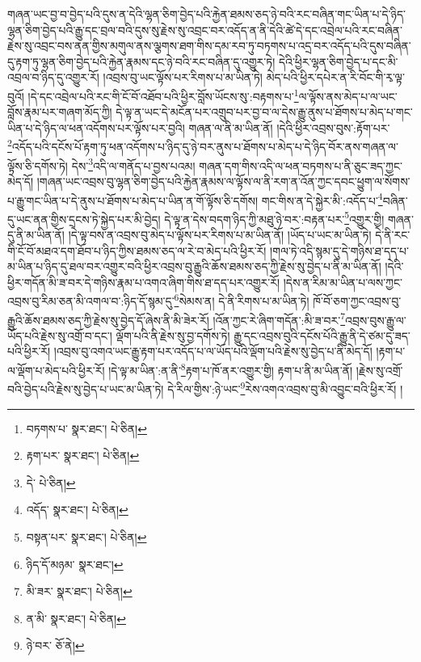 གཞན་ཡང་བྱ་བ་བྱེད་པའི་དུས་ན་དེའི་ལྷན་ཅིག་བྱེད་པའི་རྐྱེན་ཐམས་ཅད་ཉེ་བའི་རང་བཞིན་གང་ཡིན་པ་དེ་ཉིད་ལྷན་ཅིག་བྱེད་པའི་རྒྱུ་དང་བྲལ་བའི་དུས་སུ་རྗེས་སུ་འབྲང་བར་འདོད་ན་ནི་དེའི་ཚེ་དེ་དང་འབྲེལ་པའི་རང་བཞིན་རྗེས་སུ་འབྲང་བས་ནན་གྱིས་མགུལ་ནས་ལྕགས་ཐག་གིས་དམ་རབ་ཏུ་བཏགས་པ་འདྲ་བར་འདོད་པའི་དུས་བཞིན་དུ་རྟག་ཏུ་ལྷན་ཅིག་བྱེད་པའི་རྐྱེན་རྣམས་དང་ཉེ་བའི་རང་བཞིན་དུ་འགྱུར་ཏེ། དེའི་ཕྱིར་ལྷན་ཅིག་བྱེད་པ་དང་མི་འབྲལ་བ་ཉིད་དུ་འགྱུར་རོ། །འབྲས་བུ་ཡང་ལྟོས་པར་རིགས་པ་མ་ཡིན་ཏེ། མེད་པའི་ཕྱིར་དཔེར་ན་རི་བོང་གི་རྭ་ལྟ་བུའོ། །དེ་དང་འབྲེལ་པའི་རང་གི་ངོ་བོ་འཐོབ་པའི་ཕྱིར་བློས་ཡོངས་སུ་:བརྟགས་པ་\footnote{བཏགས་པ་  སྣར་ཐང་།  པེ་ཅིན། }ལ་ལྟོས་ནས་མེད་པ་ལ་ཡང་བློས་རྣམ་པར་གཞག་མོད་ཀྱི། དེ་ལྟ་ན་ཡང་དེ་མངོན་པར་འགྲུབ་པར་བྱ་བ་ལ་དེས་རྒྱུ་ནུས་པ་ཐོགས་པ་མེད་པ་གང་ཡིན་པ་དེ་ཉིད་ལ་ཕན་འདོགས་པར་ལྟོས་པར་བྱའི། གཞན་ལ་ནི་མ་ཡིན་ནོ། །དེའི་ཕྱིར་འབྲས་བུས་:རྟོག་པར་\footnote{རྟག་པར་  སྣར་ཐང་།  པེ་ཅིན། }འདོད་པའི་དངོས་པོ་རྟག་ཏུ་ཕན་འདོགས་པ་ཉིད་དུ་ཉེ་བར་ནུས་པ་ཐོགས་པ་མེད་པ་དེ་ཉིད་བོར་ནས་གཞན་ལ་ལྟོས་ཅི་དགོས་ཏེ། དེས་\footnote{དེ་  པེ་ཅིན། }འདི་ལ་གནོད་པ་བྱས་པའམ། གཞན་དག་གིས་འདི་ལ་ཕན་བཏགས་པ་ནི་ཅུང་ཟད་ཀྱང་མེད་དོ། །གཞན་ཡང་འབྲས་བུ་ལྷན་ཅིག་བྱེད་པའི་རྐྱེན་རྣམས་ལ་ལྟོས་ལ་ནི་རག་ན་འོན་ཀྱང་དབང་ཕྱུག་ལ་སོགས་པ་རྒྱུ་གང་ཡིན་པ་དེ་ནུས་པ་ཐོགས་པ་མེད་པ་ཡིན་ན་གོ་ལྟོས་ཅི་དགོས། གང་གིས་ན་དེ་སྐྱེར་མི་:འདོད་པ་\footnote{འདོད་  སྣར་ཐང་།  པེ་ཅིན། }བཞིན་དུ་ཡང་ནན་གྱིས་དྲངས་ཏེ་སྐྱེད་པར་མི་བྱེད། དེ་ལྟ་ན་དེས་བདག་ཉིད་ཀྱི་མཐུ་ཉེ་བར་:བརྟན་པར་\footnote{བསྟན་པར་  སྣར་ཐང་།  པེ་ཅིན། }འགྱུར་གྱི། གཞན་དུ་ནི་མ་ཡིན་ནོ། །དེ་ལྟ་བས་ན་འབྲས་བུ་མེད་པ་ལྟོས་པར་རིགས་པ་མ་ཡིན་ནོ། །ཡོད་པ་ཡང་མ་ཡིན་ཏེ། དེ་ནི་རང་གི་ངོ་བོ་མཐའ་དག་ཐོབ་པ་ཉིད་ཀྱིས་ཐམས་ཅད་ལ་རེ་བ་མེད་པའི་ཕྱིར་རོ། །གལ་ཏེ་འདི་སྙམ་དུ་དེ་གཉིས་ཐ་དད་པ་མ་ཡིན་པ་ཉིད་དུ་ཐལ་བར་འགྱུར་བའི་ཕྱིར་འབྲས་བུ་རྒྱུའི་ཆོས་ཐམས་ཅད་ཀྱི་རྗེས་སུ་བྱེད་པ་ནི་མ་ཡིན་ནོ། །དེའི་ཕྱིར་གདོན་མི་ཟ་བར་དེ་གཉིས་རྣམ་པ་འགའ་ཞིག་གིས་ཐ་དད་པར་འགྱུར་རོ། །དེས་ན་རིམ་མ་ཡིན་པ་ལས་ཀྱང་འབྲས་བུ་རིམ་ཅན་མི་འགལ་བ་:ཉིད་དོ་སྙམ་དུ་\footnote{ཉིད་དོ་མཉམ་  སྣར་ཐང་། }སེམས་ན། དེ་ནི་རིགས་པ་མ་ཡིན་ཏེ། ཁོ་བོ་ཅག་ཀྱང་འབྲས་བུ་རྒྱུའི་ཆོས་ཐམས་ཅད་ཀྱི་རྗེས་སུ་བྱེད་དོ་ཞེས་ནི་མི་ཟེར་རོ། །འོན་ཀྱང་རེ་ཞིག་གདོན་:མི་ཟ་བར་\footnote{མི་ཟར་  སྣར་ཐང་།  པེ་ཅིན། }འབྲས་བུས་རྒྱུ་ལ་ཡོད་པའི་རྗེས་སུ་འགྲོ་བ་དང་། ལྡོག་པའི་ནི་རྗེས་སུ་བྱ་དགོས་ཏེ། རྒྱུ་དང་འབྲས་བུའི་དངོས་པོའི་རྒྱུ་ནི་དེ་ཙམ་དུ་ཟད་པའི་ཕྱིར་རོ། །འབྲས་བུ་འགའ་ཡང་རྒྱུ་རྟག་པར་འདོད་པ་ལ་ཡོད་པའི་ལྡོག་པའི་རྗེས་སུ་བྱེད་པ་ནི་མེད་དོ། །རྟག་པ་ལ་ལྡོག་པ་མེད་པའི་ཕྱིར་རོ། །དེ་ལྟ་མ་ཡིན་:ན་ནི་\footnote{ན་མི་  སྣར་ཐང་།  པེ་ཅིན། }རྟག་པ་ཁོ་ནར་འགྱུར་གྱི། རྟག་པ་ནི་མ་ཡིན་ནོ། །རྗེས་སུ་འགྲོ་བའི་བྱེད་པའི་རྗེས་སུ་བྱེད་པ་ཡང་མ་ཡིན་ཏེ། དེ་རིལ་གྱིས་:ཉེ་ཡང་\footnote{ཉེ་བར་  ཅོ་ནེ། }རེས་འགའ་འབྲས་བུ་མི་འབྱུང་བའི་ཕྱིར་རོ། །
